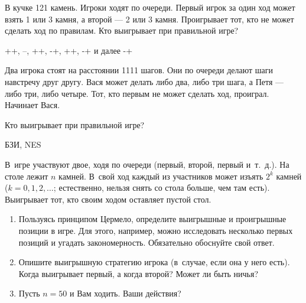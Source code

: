 \begin{problem}\par
В кучке 121 камень. Игроки ходят по очереди. Первый игрок за один ход может взять 1 или 3 камня, а второй --- 2 или 3 камня. Проигрывает тот, кто не может сделать ход по правилам. Кто выигрывает при правильной игре?

\begin{sol}
 ++, --, ++, -+, ++, -+ и далее -+
\end{sol}
\end{problem}


\begin{problem}
Два игрока стоят на расстоянии 1111 шагов. Они по очереди делают шаги навстречу друг другу. Вася может делать либо два, либо три шага, а Петя --- либо три, либо четыре. Тот, кто первым не может сделать ход, проиграл. Начинает Вася.\par
Кто выигрывает при правильной игре?\par

\begin{sol}

\end{sol}
\end{problem}




\begin{problem}
\begin{source}
БЗИ, NES
\end{source} В~игре участвуют двое, ходя
по очереди (первый, второй, первый и~т.~д.). На столе лежит
$n$ камней. В~свой ход каждый из участников может изъять
$2^k$ камней ($k=0,1,2,\ldots$; естественно, нельзя снять
со стола больше, чем там есть). Выигрывает тот, кто своим
ходом оставляет пустой стол.

\begin{enumerate}

\item Пользуясь принципом Цермело, определите выигрышные и
проигрышные позиции в игре. Для этого, например, можно
исследовать несколько первых позиций и угадать
закономерность. Обязательно обоснуйте свой ответ.

\item Опишите выигрышную стратегию игрока (в~случае, если
она у него есть). Когда выигрывает первый, а когда второй?
Может ли быть ничья?

\item Пусть $n=50$ и Вам ходить. Ваши действия?

\end{enumerate}







\begin{sol}

\end{sol}
\end{problem}




